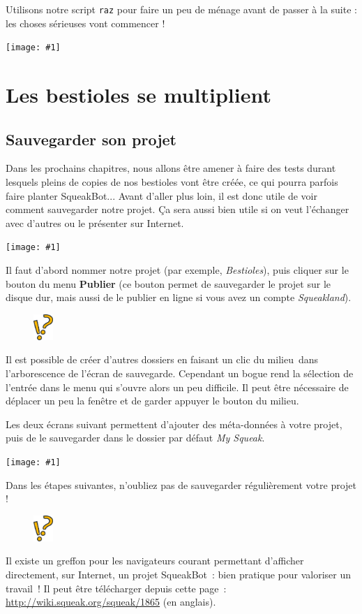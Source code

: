 \documentclass[a4paper,12pt]{book}
\def\appName{SqueakBot}
\def\cm{clic du milieu~}
\newcommand{\capture}[1]
{
\begin{center}
	\texttt{[image: \#1]}
\end{center}
}
\newcommand{\code}[1]{\texttt{#1}}
\newcommand{\important}[1]{\textbf{#1}}
\newcommand{\astuce}[1]
{
\begin{framed}
\begin{figure}
	\vspace{-15pt}
	\includegraphics[width=2.0em]{astuce.png}
\end{figure}
#1
\end{framed}
}
\let\myMargin\marginpar
\renewcommand{\marginpar}[1]{\myMargin{{\scriptsize \sffamily #1}}}
\begin{document}
Utilisons notre script \code{raz} pour faire un peu de ménage avant de passer à
la suite : les choses sérieuses vont commencer !

\capture{bestioles2.png}

\chapter{Les bestioles se multiplient}

\section{Sauvegarder son projet}

Dans les prochains chapitres, nous allons être amener à faire des tests durant
lesquels pleins de \og copies \fg de nos bestioles vont être créée, ce qui
pourra parfois faire \og planter \fg \appName... Avant d'aller plus loin, il
est donc utile de voir comment sauvegarder notre projet. Ça sera aussi bien
utile si on veut l'échanger avec d'autres ou le présenter sur Internet.

\capture{46bis.png}

Il faut d'abord nommer notre projet (par exemple, \textit{Bestioles}), puis
cliquer sur le bouton du menu \important{Publier} (ce bouton permet de
sauvegarder le projet sur le disque dur, mais aussi de le publier en ligne si
vous avez un compte \textit{Squeakland}).

\astuce{Il est possible de créer d'autres dossiers en faisant un \cm dans
l'arborescence de l'écran de sauvegarde. Cependant un bogue rend la sélection
de l'entrée dans le menu qui s'ouvre alors un peu difficile. Il peut être
nécessaire de déplacer un peu la fenêtre et de garder appuyer le bouton du
milieu.} Les deux écrans suivant permettent d'ajouter des méta-données à votre
projet, puis de le sauvegarder dans le dossier par défaut \textit{My Squeak}.

\capture{47.png}

Dans les étapes suivantes, n'oubliez pas de sauvegarder régulièrement votre
projet !

\astuce{Il existe un greffon pour les navigateurs courant permettant d'afficher
directement, sur Internet, un projet \appName~: bien pratique pour valoriser un
travail~! Il peut être télécharger depuis cette page~:
\url{http://wiki.squeak.org/squeak/1865} (en anglais).}
\end{document}
